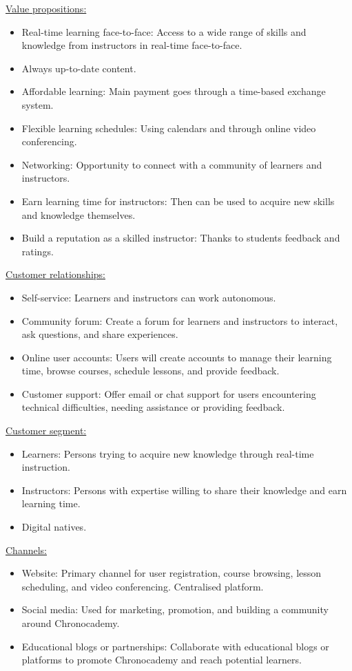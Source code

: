 \underline{Value propositions:}
\begin{itemize}
    \item Real-time learning face-to-face: Access to a wide range of skills and knowledge from instructors in real-time face-to-face.
    \item Always up-to-date content.
    \item Affordable learning: Main payment goes through a time-based exchange system.
    \item Flexible learning schedules: Using calendars and through online video conferencing.
    \item Networking: Opportunity to connect with a community of learners and instructors.
    \item Earn learning time for instructors: Then can be used to acquire new skills and knowledge themselves.
    \item Build a reputation as a skilled instructor: Thanks to students feedback and ratings.
\end{itemize}

\underline{Customer relationships:}
\begin{itemize}
    \item Self-service: Learners and instructors can work autonomous.
    \item Community forum: Create a forum for learners and instructors to interact, ask questions, and share experiences.
    \item Online user accounts: Users will create accounts to manage their learning time, browse courses, schedule lessons, and provide feedback.
    \item Customer support: Offer email or chat support for users encountering technical difficulties, needing assistance or providing feedback.
\end{itemize}

\underline{Customer segment:}
\begin{itemize}
    \item Learners: Persons trying to acquire new knowledge through real-time instruction.
    \item Instructors: Persons with expertise willing to share their knowledge and earn learning time.
    \item Digital natives.
\end{itemize}

\underline{Channels:}
\begin{itemize}
    \item Website: Primary channel for user registration, course browsing, lesson scheduling, and video conferencing.
    Centralised platform.
    \item Social media: Used for marketing, promotion, and building a community around Chronocademy.
    \item Educational blogs or partnerships: Collaborate with educational blogs or platforms to promote Chronocademy and reach potential learners.
\end{itemize}

